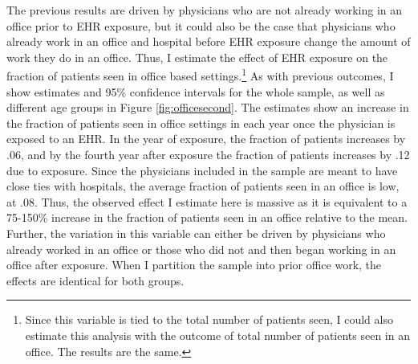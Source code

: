 \documentclass[12pt]{article}
\begin{document}
The previous results are driven by physicians who are not already working in an office prior to EHR exposure, but it could also be the case that physicians who already work in an office and hospital before EHR exposure change the amount of work they do in an office. Thus, I estimate the effect of EHR exposure on the fraction of patients seen in office based settings.\footnote{Since this variable is tied to the total number of patients seen, I could also estimate this analysis with the outcome of total number of patients seen in an office. The results are the same.} As with previous outcomes, I show estimates and 95\% confidence intervals for the whole sample, as well as different age groups in Figure \ref{fig:officesecond}. The estimates show an increase in the fraction of patients seen in office settings in each year once the physician is exposed to an EHR. In the year of exposure, the fraction of patients increases by .06, and by the fourth year after exposure the fraction of patients increases by .12 due to exposure. Since the physicians included in the sample are meant to have close ties with hospitals, the average fraction of patients seen in an office is low, at .08. Thus, the observed effect I estimate here is massive as it is equivalent to a 75-150\% increase in the fraction of patients seen in an office relative to the mean. Further, the variation in this variable can either be driven by physicians who already worked in an office or those who did not and then began working in an office after exposure. When I partition the sample into prior office work, the effects are identical for both groups. 
\end{document}
